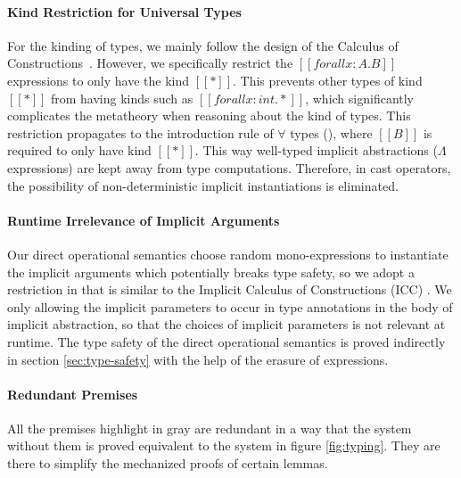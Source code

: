 \paragraph{Kind Restriction for Universal Types}
\label{sec:kind-restriction}

For the kinding of types, we mainly follow the design of the Calculus of
Constructions~\cite{CoquandThierry1988Tcoc}. However, we specifically restrict
the $[[forall x : A. B]]$
expressions to only have the kind $[[*]]$. This prevents other types of kind
$[[*]]$ from having kinds such as $[[forall x : int. *]]$,
which significantly complicates the metatheory when reasoning about the kind of types.
This restriction propagates to the introduction rule of $\forall$ types (),
where $[[B]]$ is required to only have kind $[[*]]$.
This way well-typed implicit abstractions ($\Lambda$ expressions) are kept away
from type computations. Therefore, in cast operators,
the possibility of non-deterministic implicit instantiations is eliminated.

\paragraph{Runtime Irrelevance of Implicit Arguments}

Our direct operational semantics choose random mono-expressions to instantiate
the implicit arguments which potentially breaks type safety, so we adopt a
restriction in  that is similar to the
Implicit Calculus of Constructions (ICC) \cite{miquel2001implicit}.
We only allowing the implicit parameters to occur in type annotations in the
body of implicit abstraction, so that the choices of implicit parameters is not
relevant at runtime. The type safety of the direct operational semantics is
proved indirectly in section \ref{sec:type-safety} with the help of the
erasure of expressions.

\paragraph{Redundant Premises}

All the premises highlight in gray are redundant in a way that
the system without them is proved equivalent to the system in figure \ref{fig:typing}.
They are there to simplify the mechanized proofs of certain lemmas.

